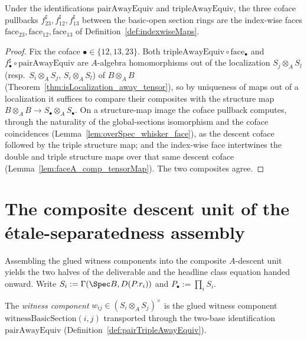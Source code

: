 \begin{lemma}
  \label{lem:tripleAwayEquiv_faceA}
  \leanok
  Under the identifications \(\mathrm{pairAwayEquiv}\) and \(\mathrm{tripleAwayEquiv}\), the
  three coface pullbacks \(f_{23}^{\sharp}, f_{12}^{\sharp}, f_{13}^{\sharp}\) between the
  basic-open section rings are the index-wise faces \(\mathrm{face}_{23}, \mathrm{face}_{12},
  \mathrm{face}_{13}\) of Definition~\ref{def:indexwiseMaps}.
\end{lemma}
\begin{proof}
  \leanok
  Fix the coface \(\bullet \in \{12, 13, 23\}\). Both \(\mathrm{tripleAwayEquiv} \circ
  \mathrm{face}_{\bullet}\) and \(f_{\bullet}^{\sharp} \circ \mathrm{pairAwayEquiv}\) are
  \(A\)-algebra homomorphisms out of the localization \(S_j \otimes_A S_l\) (resp.\ \(S_i
  \otimes_A S_j\), \(S_i \otimes_A S_l\)) of \(B \otimes_A B\)
  (Theorem~\ref{thm:isLocalization_away_tensor}), so by uniqueness of maps out of a localization
  it suffices to compare their composites with the structure map \(B \otimes_A B \to S_\bullet
  \otimes_A S_\bullet\). On a structure-map image the coface pullback computes, through the
  naturality of the global-sections isomorphism and the coface coincidences
  (Lemma~\ref{lem:overSpec_whisker_face}), as the descent coface followed by the triple
  structure map; and the index-wise face intertwines the double and triple structure maps over
  that same descent coface (Lemma~\ref{lem:faceA_comp_tensorMap}). The two composites agree.
\end{proof}

\section{The composite descent unit of the \'etale-separatedness assembly}
\label{sec:witnessAssembly}

Assembling the glued witness components into the composite \(A\)-descent unit yields the two
halves of the deliverable and the headline class equation handed onward. Write \(S_i :=
\Gamma(\Spec B, D(P.r_i))\) and \(P_{\!\bullet} := \prod_i S_i\).

\begin{definition}
  \label{def:witnessComponent}
  \leanok
  The \emph{witness component} \(w_{ij} \in (S_i \otimes_A S_j)^{\times}\) is the glued witness
  component \(\mathrm{witnessBasicSection}(i, j)\) transported through the two-base
  identification \(\mathrm{pairAwayEquiv}\) (Definition~\ref{def:pairTripleAwayEquiv}).
\end{definition}

